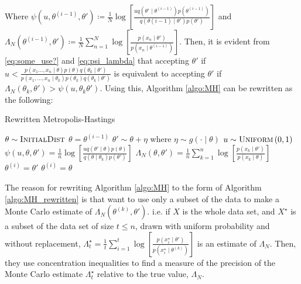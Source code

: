 Where $\psi\left(u, \theta^{(i-1)}, \theta'\right)\coloneqq \frac{1}{N}\log\left[\frac{u q\left(\theta'\mid\theta^{(i-1)}\right)p\left(\theta^{(i-1)}\right)}{q\left(\theta{(i-1)}\mid \theta'\right)p\left(\theta'\right)}\right]$ and $\Lambda_N\left(\theta^{(i-1)}, \theta'\right) \coloneqq \frac{1}{N}\sum_{n = 1}^N \log\left[\frac{p\left(x_n\mid \theta'\right)}{p\left(x_n\mid\theta^{(i-1)}\right)}\right]$. Then, it is evident from \eqref{eq:some_use?} and \eqref{eq:psi_lambda} that accepting $\theta'$ if $u < \frac{p\left(x_1\ldots, x_n\mid \theta\right)p\left(\theta\right)q\left(\theta_k\mid \theta'\right)}{p\left(x_1, \ldots, x_n\mid \theta_k\right)p\left(\theta_k\right)q\left(\theta_k\mid\theta'\right)}$ is equivalent to accepting $\theta'$ if $\Lambda_N\left(\theta_k, \theta'\right)>\psi\left(u,\theta_k\theta'\right)$. Using this, Algorithm \ref{algo:MH} can be rewritten as the following:
\begin{algorithm}[H] 
    \caption{Rewritten Metropolis-Hastings}
    \label{algo:MH_rewritten}
    \begin{algorithmic}[1] %
        \State $\theta \sim \textsc{InitialDist}$ 
        \State $\theta = \theta^{\left(i-1\right)}$ 
        \State$\theta' \sim \theta + \eta$ where $\eta\sim g\left(\cdot \mid \theta\right)$
        \State $u\sim \textsc{Uniform}\left(0,1\right)$
        \State $\psi\left(u, \theta, \theta'\right) = \frac{1}{n} \log\left[\frac{u q\left(\theta'\mid \theta \right) p \left(\theta\right)}{q\left(\theta \mid \theta_k \right)p\left(\theta'\right)} \right]$
        \State $\Lambda_N \left(\theta, \theta'\right) = \frac{1}{n} \sum_{k = 1}^n \log \left[\frac{p\left(x_{k}\mid \theta'\right)}{p\left(x_{k}\mid \theta\right)}\right]$
        \State $\theta^{\left(i\right)} = \theta'$
        \Else 
        \State $\theta^{\left(i\right)} = \theta$
         \EndIf
         \EndFor
    \end{algorithmic}
\end{algorithm}
The reason for rewriting Algorithm \ref{algo:MH} to the form of Algorithm \ref{algo:MH_rewritten} is that \cite{Bardenet:2} want to use only a subset of the data to make a Monte Carlo estimate of $\Lambda_N\left(\theta^{\left(k\right)}, \theta'\right)$. 
i.e. if $X$ is the whole data set, and $X^{\star}$ is a subset of the data set of size $t\leq n$, drawn with uniform probability and without replacement, $\Lambda^{\star}_t = \frac{1}{t} \sum_{i = 1}^t \log\left[\frac{p\left(x_i^{\star}\mid \theta'\right)}{p\left(x_i^{\star}\mid \theta^{\left(k\right)}\right)}\right]$ is an estimate of $\Lambda_N$.  Then, they use concentration inequalities to find a measure of the precision of the Monte Carlo estimate $\Lambda_t^{\star}$ relative to the true value,  $\Lambda_N$.
